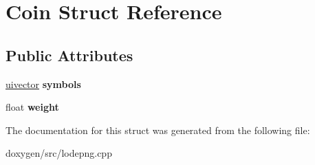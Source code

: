 \hypertarget{struct_coin}{}\section{Coin Struct Reference}
\label{struct_coin}
\subsection*{Public Attributes}
\begin{DoxyCompactItemize}
\item 
\mbox{\label{struct_coin_a1d6bc1176bb9fcbd9ca8c781c92ef432}} 
\mbox{\hyperlink{structuivector}{uivector}} {\bfseries symbols}
\item 
\mbox{\label{struct_coin_a0427f9a678a9ce031a254f40f06b3669}} 
float {\bfseries weight}
\end{DoxyCompactItemize}


The documentation for this struct was generated from the following file\+:\begin{DoxyCompactItemize}
\item 
doxygen/src/lodepng.\+cpp\end{DoxyCompactItemize}

